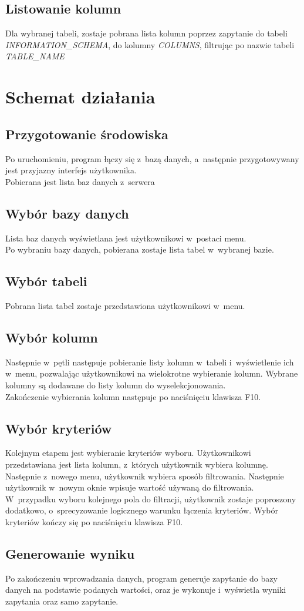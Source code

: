 \documentclass[a4paper,12pt]{article}
\begin{document}
\subsection{Listowanie kolumn}
Dla wybranej tabeli, zostaje pobrana lista kolumn poprzez zapytanie do tabeli \textit{INFORMATION\_SCHEMA}, do kolumny \textit{COLUMNS}, filtrując po nazwie tabeli \textit{TABLE\_NAME}
\section{Schemat działania}
\subsection{Przygotowanie środowiska}
Po uruchomieniu, program łączy się z~bazą danych, a~następnie przygotowywany jest przyjazny interfejs użytkownika.\\
Pobierana jest lista baz danych z~serwera
\subsection{Wybór bazy danych}
Lista baz danych wyświetlana jest użytkownikowi w~postaci menu.\\
Po wybraniu bazy danych, pobierana zostaje lista tabel w~wybranej bazie.\\
\subsection{Wybór tabeli}
Pobrana lista tabel zostaje przedstawiona użytkownikowi w~menu.
\subsection{Wybór kolumn}
Następnie w~pętli następuje pobieranie listy kolumn w~tabeli i~wyświetlenie ich w~menu, pozwalając użytkownikowi na wielokrotne wybieranie kolumn.
Wybrane kolumny są dodawane do listy kolumn do wyselekcjonowania.\\
Zakończenie wybierania kolumn następuje po naciśnięciu klawisza F10.\\
\subsection{Wybór kryteriów}
Kolejnym etapem jest wybieranie kryteriów wyboru. Użytkownikowi przedstawiana jest lista kolumn, z~których użytkownik wybiera kolumnę. Następnie z~nowego menu, użytkownik wybiera sposób filtrowania.
Następnie użytkownik w~nowym oknie wpisuje wartość używaną do filtrowania.\\
W~przypadku wyboru kolejnego pola do filtracji, użytkownik zostaje poproszony dodatkowo, o~sprecyzowanie logicznego warunku łączenia kryteriów.
Wybór kryteriów kończy się po naciśnięciu klawisza F10.\\
\subsection{Generowanie wyniku}
Po zakończeniu wprowadzania danych, program generuje zapytanie do bazy danych na podstawie podanych wartości, oraz je wykonuje i~wyświetla wyniki zapytania oraz samo zapytanie.
\end{document}
